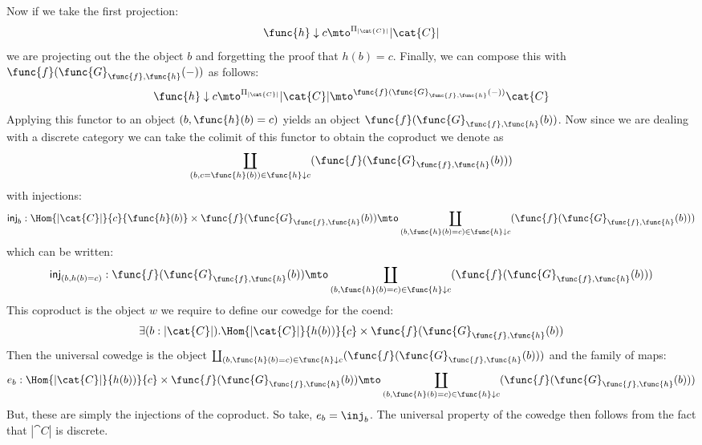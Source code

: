 Now if we take the first projection:
\[
    \func{h} \downarrow c \mto^{\Pi_{|\cat{C}|}} |\cat{C}|
\]
we are projecting out the the object $b$ and forgetting the proof
that $h(b) = c$.  Finally, we can compose this with
$\func{f}(\func{G}_{\func{f},\func{h}}(-))$ as follows:
\[
    \func{h} \downarrow c \mto^{\Pi_{|\cat{C}|}} |\cat{C}| \mto^{\func{f}(\func{G}_{\func{f},\func{h}}(-))} \cat{C}
\]
Applying this functor to an object $(b, \func{h}(b) = c)$ yields an
object $\func{f}(\func{G}_{\func{f},\func{h}}(b))$.  Now since we are
dealing with a discrete category we can take the colimit of this
functor to obtain the coproduct we denote as 
\[
   \coprod_{(b,c = \func{h}(b)) \in \func{h} \downarrow c}(\func{f}(\func{G}_{\func{f},\func{h}}(b)))
\]
with injections:
\[
    \mathsf{inj}_b : \Hom{|\cat{C}|}{c}{\func{h}(b)} \times \func{f}(\func{G}_{\func{f},\func{h}}(b)) \mto \coprod_{(b,\func{h}(b) = c) \in \func{h} \downarrow c}(\func{f}(\func{G}_{\func{f},\func{h}}(b)))
\]
which can be written:
\[
    \mathsf{inj}_{(b,h(b) = c)} : \func{f}(\func{G}_{\func{f},\func{h}}(b)) \mto \coprod_{(b,\func{h}(b) = c) \in \func{h} \downarrow c}(\func{f}(\func{G}_{\func{f},\func{h}}(b)))
\]
This coproduct is the object $w$ we require to define our cowedge for
the coend:
\[
    \exists(b : |\cat{C}|).\Hom{|\cat{C}|}{h(b))}{c} \times \func{f}(\func{G}_{\func{f},\func{h}}(b))
\]
Then the universal cowedge is the object $\coprod_{(b,\func{h}(b) = c)
\in \func{h} \downarrow c}(\func{f}(\func{G}_{\func{f},\func{h}}(b)))$
and the family of maps:
\[
    e_b : \Hom{|\cat{C}|}{h(b))}{c} \times \func{f}(\func{G}_{\func{f},\func{h}}(b)) \mto 
    \coprod_{(b,\func{h}(b) = c) \in \func{h} \downarrow c}(\func{f}(\func{G}_{\func{f},\func{h}}(b)))
\]
But, these are simply the injections of the coproduct.  So take, $e_b
= \inj_{b}$.  The universal property of the cowedge then follows from
the fact that $|\cat{C}|$ is discrete. 

